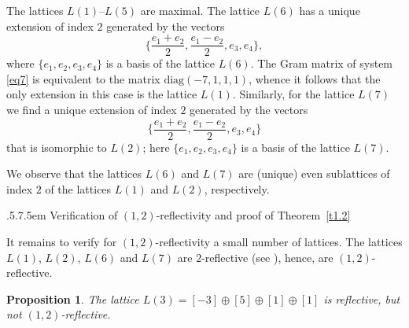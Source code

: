 \documentclass[reqno,12pt]{amsart}
\makeatletter
\def\section{\@startsection{section}{2}%
    {\z@}{.5\linespacing\@plus.7\linespacing}{.5em}%
    {\normalfont\bfseries\centering}}
\newcounter{z}
\newtheorem{proposition}{\indent Proposition}%
\makeatother
\begin{document}
The lattices  $L(1)$--$L(5)$ are maximal. The lattice $L(6)$ has a unique extension of index  $2$
generated by the vectors
\begin{equation}
\label{eq7}
\biggl\{\frac{e_1+e_2}{2}, \frac{e_1-e_2}{2}, e_3, e_4\biggr\},
\end{equation}
where $\{e_1, e_2, e_3, e_4\}$ is a basis of the lattice $L(6)$. The Gram matrix of system 
\eqref{eq7} is equivalent to the matrix $\mathrm{diag}(-7,1,1,1)$, whence it follows that
the only extension in this case is the lattice $L(1)$. Similarly, for the lattice 
 $L(7)$ we find a unique extension of index $2$ generated by the vectors
\begin{equation}
\label{eq8}
\biggl\{\frac{e_1+e_2}{2}, \frac{e_1-e_2}{2}, e_3, e_4\biggr\}
\end{equation}
that is isomorphic to $L(2)$; here $\{e_1, e_2, e_3, e_4\}$ is a basis of the lattice  $L(7)$.

We observe that the lattices $L(6)$ and $L(7)$ are (unique) even sublattices of index $2$ 
of the lattices $L(1)$ and $L(2)$, respectively. 

\section{Verification of $(1{,}2)$-reflectivity and proof of Theorem~\ref{t1.2}}
\label{s6}

It remains to verify for $(1{,}2)$-reflectivity a small number of lattices. 
The lattices  $L(1)$, $L(2)$, $L(6)$ and $L(7)$ are
$2$-reflective (see \cite{Vin07}), hence, are $(1{,}2)$-reflective.

\begin{proposition}
\label{p6.1}
The lattice  $L(3)=[-3] \oplus [5] \oplus [1] \oplus [1]$ is reflective, but not
$(1{,}2)$-reflective.
\end{proposition}
\end{document}
